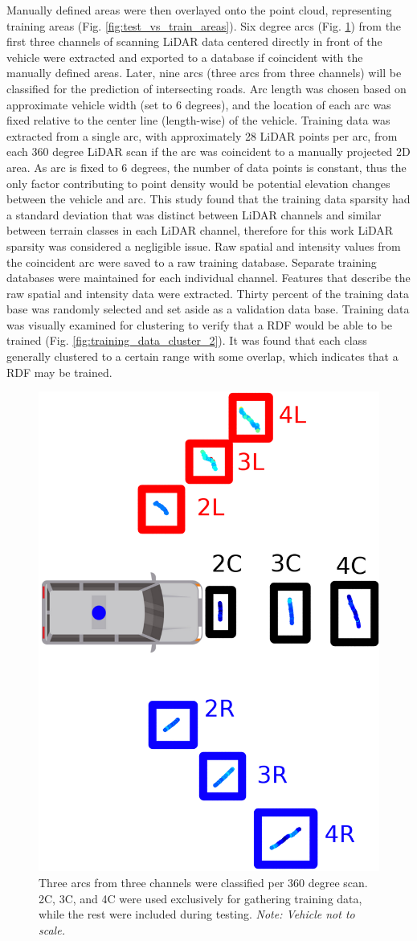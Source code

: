 \documentclass[journal,onecolumn]{IEEEtran}
\begin{document}
			{Manually defined areas were then overlayed onto the point cloud, representing training areas (Fig. \ref{fig:test_vs_train_areas}). Six degree arcs (Fig. \ref{fig:area_example}) from the first three channels of scanning LiDAR data centered directly in front of the vehicle were extracted and exported to a database if coincident with the manually defined areas. Later, nine arcs (three arcs from three channels) will be classified for the prediction of intersecting roads. Arc length was chosen based on approximate vehicle width (set to 6 degrees), and the location of each arc was fixed relative to the center line (length-wise) of the vehicle. Training data was extracted from a single arc, with approximately 28 LiDAR points per arc, from each 360 degree LiDAR scan if the arc was coincident to a manually projected 2D area. As arc is fixed to 6 degrees, the number of data points is constant, thus the only factor contributing to point density would be potential elevation changes between the vehicle and arc. This study found that the training data sparsity had a standard deviation that was distinct between LiDAR channels and similar between terrain classes in each LiDAR channel, therefore for this work LiDAR sparsity was considered a negligible issue. Raw spatial and intensity values from the coincident arc were saved to a raw training database. Separate training databases were maintained for each individual channel. Features that describe the raw spatial and intensity data were extracted. Thirty percent of the training data base was randomly selected and set aside as a validation data base. Training data was visually examined for clustering to verify that a RDF would be able to be trained (Fig. \ref{fig:training_data_cluster_2}). It was found that each class generally clustered to a certain range with some overlap, which indicates that a RDF may be trained. }
			
			\begin{figure}[H]
				\centering
				\includegraphics[width=0.25\linewidth]{figures/nine_arcs_example}
				\caption[Areas to Classify]{Three arcs from three channels were classified per 360 degree scan. 2C, 3C, and 4C were used exclusively for gathering training data, while the rest were included during testing. \textit{Note: Vehicle not to scale.}}
				\label{fig:area_example}
			\end{figure}
		
\end{document}
